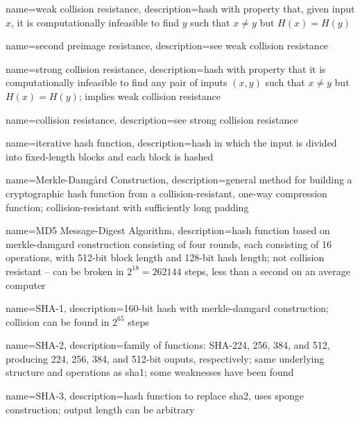 {
    name={weak collision resistance},
    description={hash with property that, given input $x$, it is computationally infeasible to find $y$ such that $x\neq y$ but $H(x) = H(y)$}
}

{
    name={second preimage resistance},
    description={see \gls{weak collision resistance}}
}

{
    name={strong collision resistance},
    description={hash with property that it is computationally infeasible to find any pair of inputs $(x, y)$ such that $x\neq y$ but $H(x) = H(y)$; implies \gls{weak collision resistance}}
}

{
    name={collision resistance},
    description={see \gls{strong collision resistance}}
}

{
    name={iterative hash function},
    description={hash in which the input is divided into fixed-length blocks and each block is hashed}
}

{
    name={Merkle-Damg\r{a}rd Construction},
    description={general method for building a cryptographic hash function from a collision-resistant, one-way compression function; collision-resistant with sufficiently long padding}
}

{
    name={MD5 Message-Digest Algorithm},
    description={hash function based on \gls{merkle-damgard construction} consisting of four rounds, each consisting of 16 operations, with 512-bit block length and 128-bit hash length; not collision resistant -- can be broken in $2^{18} = 262144$ steps, less than a second on an average computer}
}

{
    name={SHA-1},
    description={160-bit hash with \gls{merkle-damgard construction}; collision can be found in $2^{65}$ steps}
}

{
    name={SHA-2},
    description={family of functions: SHA-224, 256, 384, and 512, producing 224, 256, 384, and 512-bit ouputs, respectively; same underlying structure and operations as \gls{sha1}; some weaknesses have been found}
}

{
    name={SHA-3},
    description={hash function to replace \gls{sha2}, uses \gls{sponge construction}; output length can be arbitrary}
}

